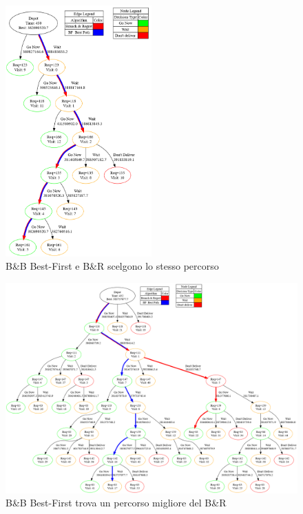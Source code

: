 \documentclass[
    article,            %
    12pt,                %
    oneside,            %
    a4paper,            %
    english,            %
    italian,                %
    sumario=tradicional,
]{abntex2}
\begin{document}
\vspace{2cm}
\begin{figure}[!h]
    \centering
    \includegraphics[width=0.5\textwidth]{Images/same_path.png}
    \par
    \caption{B\&B Best-First e B\&R scelgono lo stesso percorso}
    \label{fig:BBBFuguale}
\end{figure}
\newpage{}
\vspace*{\fill}
\begin{figure}[h!]
    \centering
    \includegraphics[width=1.0\textwidth]{Images/omg.png}
    \caption{B\&B Best-First trova un percorso migliore del B\&R}
    \label{fig:BBBFmigliore}
\end{figure}
\end{document}
